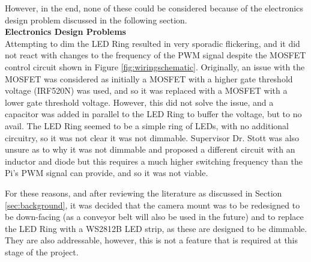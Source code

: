 \vspace{-0.5em}
\noindent
However, in the end, none of these could be considered because of the electronics design problem discussed in the following section. \\
\noindent
\textbf{Electronics Design Problems} \\
Attempting to dim the LED Ring resulted in very sporadic flickering, and it did not react with changes to the frequency of the PWM signal despite the MOSFET control circuit shown in Figure \ref*{fig:wiringschematic}.
Originally, an issue with the MOSFET was considered as initially a MOSFET with a higher gate threshold voltage (IRF520N) was used, and so it was replaced with a MOSFET with a lower gate threshold voltage.
However, this did not solve the issue, and a capacitor was added in parallel to the LED Ring to buffer the voltage, but to no avail.
The LED Ring seemed to be a simple ring of LEDs, with no additional circuitry, so it was not clear it was not dimmable. Supervisor Dr. Stott was also unsure as to why it was not dimmable and proposed a different circuit with an inductor and diode but this requires
a much higher switching frequency than the Pi's PWM signal can provide, and so it was not viable. 

For these reasons, and after reviewing the literature as discussed in Section \ref*{sec:background}, it was decided that the camera mount was to be redesigned to be down-facing (as a conveyor belt will also be used in the future)
and to replace the LED Ring with a WS2812B LED strip, as these are designed to be dimmable. They are also addressable, however, this is not a feature that is required at this stage of the project.

